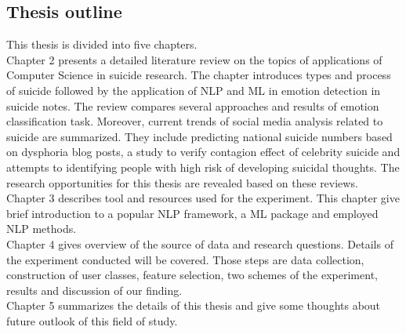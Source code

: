 \subsection*{Thesis outline}
This thesis is divided into five chapters.\\
Chapter 2 presents a detailed literature review on the topics of applications of Computer Science in suicide research. The chapter introduces types and process of suicide followed by the application of NLP and ML in emotion detection in suicide notes. The review compares several approaches and results of emotion classification task. Moreover, current trends of social media analysis related to suicide are summarized. They include predicting national suicide numbers based on dysphoria blog posts, a study to verify contagion effect of celebrity suicide and attempts to identifying people with high risk of developing suicidal thoughts. The research opportunities for this thesis are revealed based on these reviews.\\
Chapter 3 describes tool and resources used for the experiment. This chapter give brief introduction to a popular NLP framework, a ML package and employed NLP methods.\\
Chapter 4 gives overview of the source of data and research questions. Details of the experiment conducted will be covered. Those steps are data collection, construction of user classes, feature selection, two schemes of the experiment, results and discussion of our finding.\\
Chapter 5 summarizes the details of this thesis and give some thoughts about future outlook of this field of study.\\



